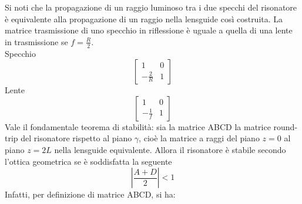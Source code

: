 \documentclass{book}
\theoremstyle{remark}
\begin{document}
Si noti che la propagazione di un raggio luminoso tra i due specchi del risonatore è equivalente alla propagazione di un raggio nella lensguide così costruita.
La matrice trasmissione di uno specchio in riflessione è uguale a quella di una lente in trasmissione se $f = \frac{R}{2}$.\\
Specchio
\begin{equation*}
\begin{bmatrix}
1	&	0\\
-\frac{2}{R}	&	1
\end{bmatrix}
\end{equation*}
Lente
\begin{equation*}
\begin{bmatrix}
1	&	0\\
-\frac{1}{f}	&	1
\end{bmatrix}
\end{equation*}
Vale il fondamentale teorema di stabilità: sia la matrice ABCD la matrice round-trip del risonatore rispetto al piano $\gamma$, cioè la matrice a raggi del piano $z=0$ al piano $z=2L$ nella lensguide equivalente. Allora il risonatore è stabile secondo l'ottica geometrica se è soddisfatta la seguente
\begin{equation*}
\left| \frac{A+D}{2} \right| < 1
\end{equation*}
Infatti, per definizione di matrice ABCD, si ha:
\end{document}
